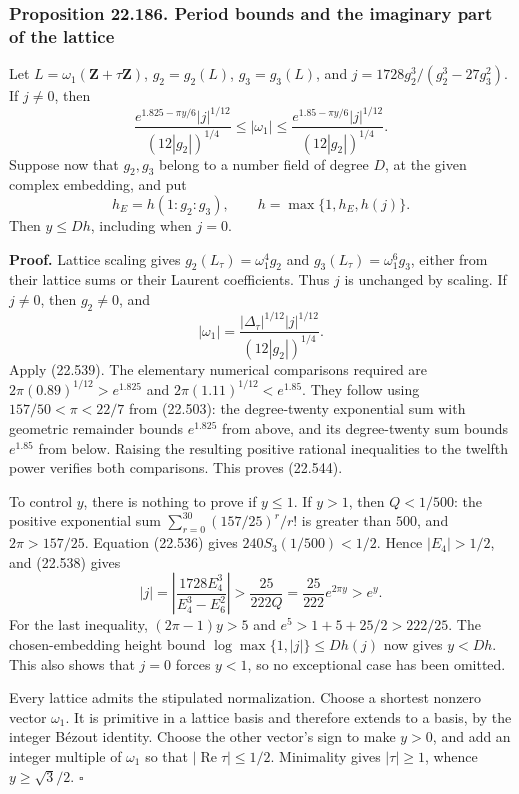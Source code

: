 \documentclass[
  11pt,
  a4paper,
]{article}
\begin{document}
\subsubsection{Proposition 22.186. Period bounds and the imaginary part
of the
lattice}\label{proposition-22.186.-period-bounds-and-the-imaginary-part-of-the-lattice}

Let \(L=\omega_1(\mathbf Z+\tau\mathbf Z)\), \(g_2=g_2(L)\),
\(g_3=g_3(L)\), and \(j=1728g_2^3/(g_2^3-27g_3^2)\). If \(j\ne0\), then
\[
 \frac{e^{1.825-\pi y/6}|j|^{1/12}}{(12|g_2|)^{1/4}}
 \le |\omega_1|\le
 \frac{e^{1.85-\pi y/6}|j|^{1/12}}{(12|g_2|)^{1/4}}.
 \tag{22.544}
\] Suppose now that \(g_2,g_3\) belong to a number field of degree
\(D\), at the given complex embedding, and put \[
 h_E=h(1:g_2:g_3),\qquad h=\max\{1,h_E,h(j)\}.
 \tag{22.545}
\] Then \(y\le Dh\), including when \(j=0\).

\textbf{Proof.} Lattice scaling gives \(g_2(L_\tau)=\omega_1^4g_2\) and
\(g_3(L_\tau)=\omega_1^6g_3\), either from their lattice sums or their
Laurent coefficients. Thus \(j\) is unchanged by scaling. If \(j\ne0\),
then \(g_2\ne0\), and \[
 |\omega_1|
 =\frac{|\Delta_\tau|^{1/12}|j|^{1/12}}
        {(12|g_2|)^{1/4}}.
 \tag{22.546}
\] Apply (22.539). The elementary numerical comparisons required are
\(2\pi(0.89)^{1/12}>e^{1.825}\) and \(2\pi(1.11)^{1/12}<e^{1.85}\). They
follow using \(157/50<\pi<22/7\) from (22.503): the degree-twenty
exponential sum with geometric remainder bounds \(e^{1.825}\) from
above, and its degree-twenty sum bounds \(e^{1.85}\) from below. Raising
the resulting positive rational inequalities to the twelfth power
verifies both comparisons. This proves (22.544).

To control \(y\), there is nothing to prove if \(y\le1\). If \(y>1\),
then \(Q<1/500\): the positive exponential sum
\(\sum_{r=0}^{30}(157/25)^r/r!\) is greater than \(500\), and
\(2\pi>157/25\). Equation (22.536) gives \(240S_3(1/500)<1/2\). Hence
\(|E_4|>1/2\), and (22.538) gives \[
 |j|=\left|\frac{1728E_4^3}{E_4^3-E_6^2}\right|
 >\frac{25}{222Q}=\frac{25}{222}e^{2\pi y}>e^y.
 \tag{22.547}
\] For the last inequality, \((2\pi-1)y>5\) and \(e^5>1+5+25/2>222/25\).
The chosen-embedding height bound \(\log\max\{1,|j|\}\le D h(j)\) now
gives \(y<Dh\). This also shows that \(j=0\) forces \(y<1\), so no
exceptional case has been omitted.

Every lattice admits the stipulated normalization. Choose a shortest
nonzero vector \(\omega_1\). It is primitive in a lattice basis and
therefore extends to a basis, by the integer Bézout identity. Choose the
other vector's sign to make \(y>0\), and add an integer multiple of
\(\omega_1\) so that \(|\operatorname{Re}\tau|\le1/2\). Minimality gives
\(|\tau|\ge1\), whence \(y\ge\sqrt3/2\). \(\square\)
\end{document}
